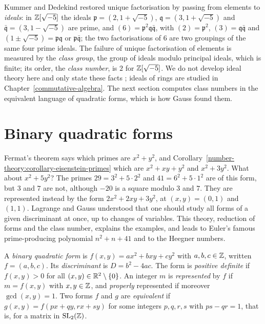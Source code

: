 Kummer and Dedekind restored unique factorisation by passing from elements to \emph{ideals}: in $\mathbb{Z}[\sqrt{-5}]$ the ideals $\mathfrak{p} = (2, 1 + \sqrt{-5})$, $\mathfrak{q} = (3, 1 + \sqrt{-5})$ and
$\bar{\mathfrak{q}} = (3, 1 - \sqrt{-5})$ are prime, and $(6) = \mathfrak{p}^2\mathfrak{q}\bar{\mathfrak{q}}$, with $(2) = \mathfrak{p}^2$, $(3) = \mathfrak{q}\bar{\mathfrak{q}}$ and
$(1 \pm \sqrt{-5}) = \mathfrak{p}\mathfrak{q}$ or $\mathfrak{p}\bar{\mathfrak{q}}$; the two factorisations of $6$ are two groupings of the same four prime ideals. The failure of unique factorisation of
elements is measured by the \emph{class group}, the group of ideals modulo principal ideals, which is finite; its order, the \emph{class number}, is $2$ for $\mathbb{Z}[\sqrt{-5}]$. We do not develop ideal theory here and only state these facts \cite{ireland-rosen}; ideals of rings are studied in Chapter~\ref{commutative-algebra}. The next section computes
class numbers in the equivalent language of quadratic forms, which is how Gauss found them.

\section{Binary quadratic forms}\label{number-theory:section-quadratic-forms}

Fermat's theorem says which primes are $x^2 + y^2$, and Corollary~\ref{number-theory:corollary-eisenstein-primes} which are $x^2 + xy + y^2$ and $x^2 + 3y^2$. What about $x^2 + 5y^2$? The primes
$29 = 3^2 + 5 \cdot 2^2$ and $41 = 6^2 + 5 \cdot 1^2$ are of this form, but $3$ and $7$ are not, although $-20$ is a square modulo $3$ and $7$. They are represented instead by the form
$2x^2 + 2xy + 3y^2$, at $(x, y) = (0, 1)$ and $(1, 1)$. Lagrange and Gauss understood that one should study all forms of a given discriminant at once, up to changes of
variables. This theory, reduction of forms and the class number, explains the examples, and leads to Euler's famous prime-producing polynomial $n^2 + n + 41$ and to the Heegner numbers.

\begin{definition}\label{number-theory:definition-binary-form}
A \emph{binary quadratic form} is $f(x, y) = ax^2 + bxy + cy^2$ with $a, b, c \in \mathbb{Z}$, written $f = (a, b, c)$. Its \emph{discriminant} is $D = b^2 - 4ac$. The form is \emph{positive definite} if
$f(x, y) > 0$ for all $(x, y) \in \mathbb{R}^2 \setminus \{0\}$. An integer $m$ is \emph{represented} by $f$ if $m = f(x, y)$ with $x, y \in \mathbb{Z}$, and \emph{properly} represented if moreover $\gcd(x, y) = 1$. Two forms
$f$ and $g$ are \emph{equivalent} if $g(x, y) = f(px + qy, rx + sy)$ for some integers $p, q, r, s$ with $ps - qr = 1$, that is, for a matrix in $\mathrm{SL}_2(\mathbb{Z})$.
\end{definition}

